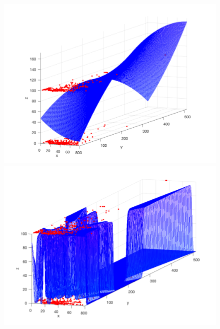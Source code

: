 \documentclass[12pt]{article}
\begin{document}
\begin{figure}[h!]
\centering
\begin{minipage}{.5\textwidth}
  \centering
  \includegraphics[scale=0.2]{2Dcurve.png}
\end{minipage}%
\begin{minipage}{.5\textwidth}
  \centering
  \includegraphics[scale=0.2]{DNN.png}
\end{minipage}
\end{figure}
\end{document}
